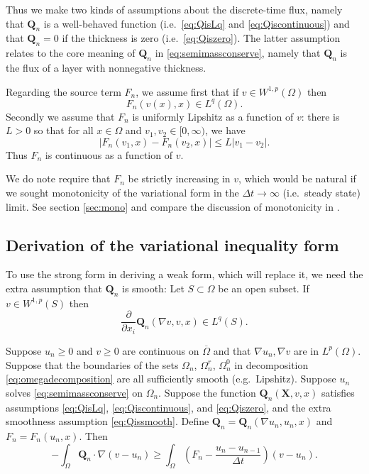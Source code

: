 \documentclass[final,leqno,onefignum,onetabnum]{siamltex1213bueler}
\newcommand\bQ{\mathbf{Q}}
\newcommand\bX{\mathbf{X}}
\renewcommand{\grad}{\nabla}
\begin{document}
Thus we make two kinds of assumptions about the discrete-time flux, namely that $\bQ_n$ is a well-behaved function (i.e.~\eqref{eq:QisLq} and \eqref{eq:Qiscontinuous}) and
that $\bQ_n=0$ if the thickness is zero (i.e.~\eqref{eq:Qiszero}).  The latter assumption relates to the core meaning of $\bQ_n$ in \eqref{eq:semimassconserve}, namely that $\bQ_n$ is the flux of a layer with nonnegative thickness.

Regarding the source term $F_n$, we assume first that if $v\in W^{1,p}(\Omega)$ then
\begin{equation}
F_n(v(x),x) \in L^q(\Omega).  \label{eq:FisLq}
\end{equation}
Secondly we assume that $F_n$ is uniformly Lipshitz as a function of $v$: there is $L>0$ so that for all $x\in\Omega$ and $v_1,v_2 \in [0,\infty)$, we have
\begin{equation}
\left|F_n(v_1,x)-F_n(v_2,x)\right| \le L |v_1-v_2|.  \label{eq:Fislip}
\end{equation}
Thus $F_n$ is continuous as a function of $v$.

We do note require that $F_n$ be strictly increasing in $v$, which would be natural if we sought monotonicity of the variational form in the $\Delta t \to \infty$ (i.e.~steady state) limit.  See section \ref{sec:mono} and compare the discussion of monotonicity in  \cite{JouvetBueler2012}.

\subsection{Derivation of the variational inequality form}  \label{subsec:derivevi}  To use the strong form in deriving a weak form, which will replace it, we need the extra assumption that $\bQ_n$ is smooth:  Let $S \subset \Omega$ be an open subset.  If $v\in W^{1,p}(S)$ then
\begin{equation}
\frac{\partial}{\partial x_i} \bQ_n(\grad v,v,x) \in L^q(S). \label{eq:Qissmooth}
\end{equation}

\medskip
\begin{theorem} \label{thm:strongimpliesweak} Suppose $u_n\ge 0$ and $v\ge 0$ are continuous on $\overline{\Omega}$ and that $\grad u_n,\grad v$ are in $L^p(\Omega)$.  Suppose that the boundaries of the sets $\Omega_n$, $\Omega_n^r$, $\Omega_n^0$ in decomposition \eqref{eq:omegadecomposition} are all sufficiently smooth (e.g.~Lipshitz).  Suppose $u_n$ solves \eqref{eq:semimassconserve} on $\Omega_n$.  Suppose the function $\bQ_n(\bX,v,x)$ satisfies assumptions \eqref{eq:QisLq}, \eqref{eq:Qiscontinuous}, and \eqref{eq:Qiszero}, and the extra smoothness assumption \eqref{eq:Qissmooth}.  Define $\bQ_n=\bQ_n(\grad u_n,u_n,x)$ and $F_n = F_n(u_n,x)$.  Then
\begin{equation}
-\int_{\Omega} \bQ_n \cdot \grad(v-u_n) \ge \int_{\Omega} \left(F_n - \frac{u_n - u_{n-1}}{\Delta t}\right) (v-u_n). \label{eq:morallytheVI}
\end{equation}
\end{theorem}
\end{document}
